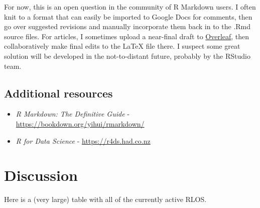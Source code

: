 \documentclass[a4paper, nobind]{templates/ociamthesis}
\begin{document}
For now, this is an open question in the community of R Markdown users.
I often knit to a format that can easily be imported to Google Docs for comments, then go over suggested revisions and manually incorporate them back in to the .Rmd source files.
For articles, I sometimes upload a near-final draft to \href{https://www.overleaf.com/}{Overleaf}, then collaboratively make final edits to the LaTeX file there.
I suspect some great solution will be developed in the not-to-distant future, probably by the RStudio team.

\hypertarget{additional-resources}{%
\section{Additional resources}\label{additional-resources}}

\begin{itemize}
\item
  \emph{R Markdown: The Definitive Guide} - \url{https://bookdown.org/yihui/rmarkdown/}
\item
  \emph{R for Data Science} - \url{https://r4ds.had.co.nz}
\end{itemize}

\hypertarget{Discussion}{%
\chapter{Discussion}\label{Discussion}}

\minitoc 

Here is a (very large) table with all of the currently active RLOS.
\end{document}
